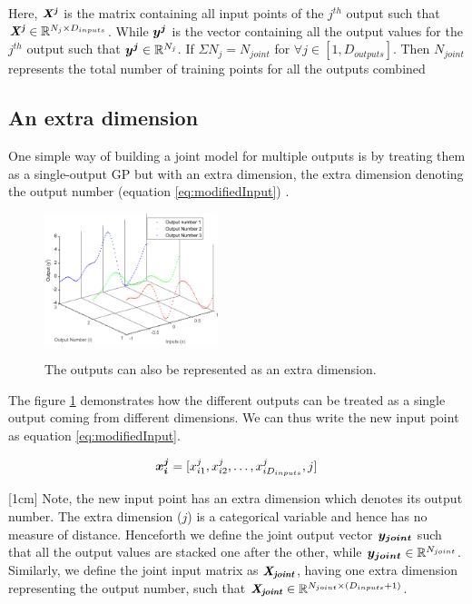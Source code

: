 Here, \(\bm{\mathit{X^j}}\) is the matrix containing all input points of the $j^{th}$ output such that \(\bm{\mathit{X^j}} \in \mathbb{R}^{N_{j} \times D_{inputs}}\). While  \(\boldsymbol{y^{j}}\) is the vector containing all the output values for the \(j^{th}\) output such that \(\boldsymbol{y^{j}} \in \mathbb{R}^{N_{j}}\). If \(\Sigma N_{j} = N_{joint}\) for \( \forall  j \in [1, D_{outputs}]\). Then \(N_{joint}\) represents the total number of training points for all the outputs combined

\subsection{An extra dimension}\label{subsecAnExtraDimension}
One simple way of building a joint model for multiple outputs is by treating them as a single-output GP but with an extra dimension, the extra dimension denoting the output number (equation \ref{eq:modifiedInput}) \cite{osborne2010bayesian}. 

\begin{figure}[!ht]
  \centering
        \includegraphics[width=0.45\textwidth]
        {images/part3/outputsAsAnExtraDimension}
        \label{figoutputsAsAnExtraDimension}
        \caption{The outputs can also be represented as an extra dimension.}
\end{figure}

The figure \ref{figoutputsAsAnExtraDimension} demonstrates how the different outputs can be treated as a single output coming from different dimensions. We can thus write the new input point as equation \ref{eq:modifiedInput}.

\begin{equation}\label{eq:modifiedInput}
    \boldsymbol{x_{i}^{j}} = [x_{i1}^{j}, x_{i2}^{j}, \ldots, x_{iD_{inputs}}^{j}, j]
\end{equation}


[1cm]
Note, the new input point has an extra dimension which denotes its output number. The extra dimension ($j$) is a categorical variable and hence has no measure of distance. Henceforth we define the joint output vector \(\boldsymbol{y_{joint}}\) such that all the output values are stacked one after the other, while \(\boldsymbol{y_{joint}} \in \mathbb{R}^{N_{joint}}\). Similarly, we define the joint input matrix as \(\bm{\mathit{X_{joint}}}\), having one extra dimension representing the output number, such that \(\bm{\mathit{X_{joint}}} \in \mathbb{R}^{N_{joint} \times (D_{inputs}+1)}\).  

